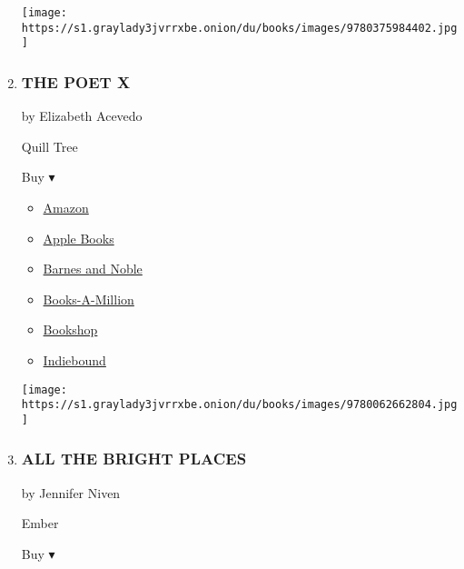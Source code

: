 \begin{enumerate}
  \texttt{[image: https://s1.graylady3jvrrxbe.onion/du/books/images/9780375984402.jpg]}
\item
  \hypertarget{the-poet-x}{%
  \subsubsection{THE POET X}\label{the-poet-x}}

  by Elizabeth Acevedo

  Quill Tree

  Buy ▾

  \begin{itemize}
  \tightlist
  \item
    \href{https://www.amazon.com/Poet-X-Elizabeth-Acevedo/dp/0062662805?tag=NYTBS-20}{Amazon}
  \item
    \href{https://du-gae-books-dot-nyt-du-prd.appspot.com/buy?title=THE+POET+X\&author=Elizabeth+Acevedo}{Apple
    Books}
  \item
    \href{https://www.anrdoezrs.net/click-7990613-11819508?url=https\%3A\%2F\%2Fwww.barnesandnoble.com\%2Fw\%2F\%3Fean\%3D9780062662811}{Barnes
    and Noble}
  \item
    \href{https://www.anrdoezrs.net/click-7990613-35140?url=https\%3A\%2F\%2Fwww.booksamillion.com\%2Fp\%2FTHE\%2BPOET\%2BX\%2FElizabeth\%2BAcevedo\%2F9780062662811}{Books-A-Million}
  \item
    \href{https://bookshop.org/a/3546/9780062662811}{Bookshop}
  \item
    \href{https://www.indiebound.org/book/9780062662811?aff=NYT}{Indiebound}
  \end{itemize}

  \texttt{[image: https://s1.graylady3jvrrxbe.onion/du/books/images/9780062662804.jpg]}
\item
  \hypertarget{all-the-bright-places}{%
  \subsubsection{ALL THE BRIGHT PLACES}\label{all-the-bright-places}}

  by Jennifer Niven

  Ember

  Buy ▾


\end{enumerate}

